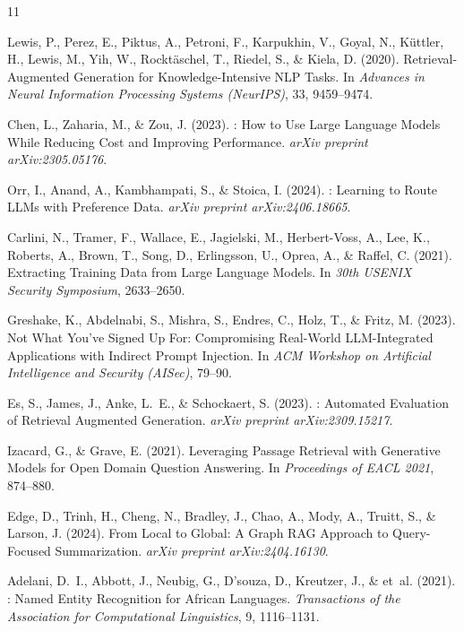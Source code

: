\documentclass{article}
\begin{document}
\begin{thebibliography}{11}

Lewis, P., Perez, E., Piktus, A., Petroni, F., Karpukhin, V., Goyal, N., K\"uttler, H., Lewis, M., Yih, W., Rockt\"aschel, T., Riedel, S., \& Kiela, D. (2020).
\newblock Retrieval-Augmented Generation for Knowledge-Intensive {NLP} Tasks.
\newblock In \emph{Advances in Neural Information Processing Systems (NeurIPS)}, 33, 9459--9474.

Chen, L., Zaharia, M., \& Zou, J. (2023).
: How to Use Large Language Models While Reducing Cost and Improving Performance.
\newblock \emph{arXiv preprint arXiv:2305.05176}.

Orr, I., Anand, A., Kambhampati, S., \& Stoica, I. (2024).
: Learning to Route {LLMs} with Preference Data.
\newblock \emph{arXiv preprint arXiv:2406.18665}.

Carlini, N., Tramer, F., Wallace, E., Jagielski, M., Herbert-Voss, A., Lee, K., Roberts, A., Brown, T., Song, D., Erlingsson, U., Oprea, A., \& Raffel, C. (2021).
\newblock Extracting Training Data from Large Language Models.
\newblock In \emph{30th USENIX Security Symposium}, 2633--2650.

Greshake, K., Abdelnabi, S., Mishra, S., Endres, C., Holz, T., \& Fritz, M. (2023).
\newblock Not What You've Signed Up For: Compromising Real-World {LLM}-Integrated
  Applications with Indirect Prompt Injection.
\newblock In \emph{ACM Workshop on Artificial Intelligence and Security (AISec)}, 79--90.

Es, S., James, J., Anke, L.~E., \& Schockaert, S. (2023).
: Automated Evaluation of Retrieval Augmented Generation.
\newblock \emph{arXiv preprint arXiv:2309.15217}.

Izacard, G., \& Grave, E. (2021).
\newblock Leveraging Passage Retrieval with Generative Models for Open Domain
  Question Answering.
\newblock In \emph{Proceedings of EACL 2021}, 874--880.

Edge, D., Trinh, H., Cheng, N., Bradley, J., Chao, A., Mody, A., Truitt, S., \& Larson, J. (2024).
\newblock From Local to Global: A Graph {RAG} Approach to Query-Focused Summarization.
\newblock \emph{arXiv preprint arXiv:2404.16130}.

Adelani, D.~I., Abbott, J., Neubig, G., D'souza, D., Kreutzer, J., \& et~al. (2021).
: Named Entity Recognition for African Languages.
\newblock \emph{Transactions of the Association for Computational Linguistics}, 9, 1116--1131.


\end{thebibliography}
\end{document}
